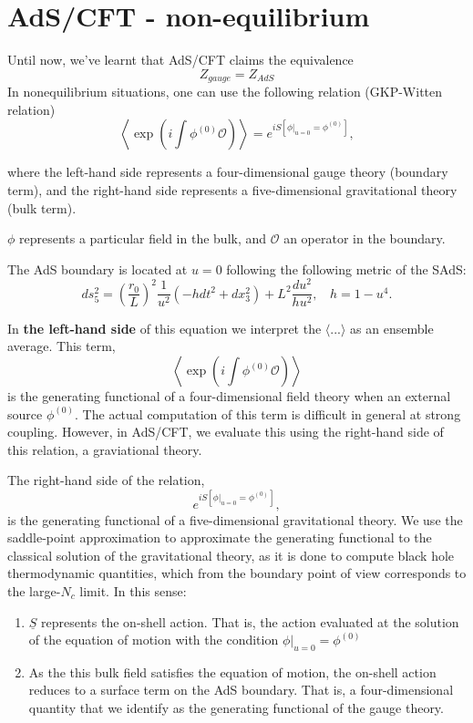 \documentclass[12pt]{article}
\begin{document}
\section{AdS/CFT - non-equilibrium}

Until now, we've learnt that AdS/CFT claims the equivalence
\[
    Z_{gauge} = Z_{AdS}
\]
In nonequilibrium situations, one can use the following relation (GKP-Witten relation)
\[
    \left\langle\exp\left(i\int \phi^{(0)} \mathcal{O}\right)\right\rangle = e^{iS[\left.\phi\right|_{u=0}=\phi^{(0)}]},
\]

where the left-hand side represents a four-dimensional gauge theory (boundary term), and the right-hand side represents a five-dimensional gravitational theory (bulk term).

\vspace{.25cm}

$\phi$ represents a particular field in the bulk, and $\mathcal{O}$ an operator in the boundary.

\vspace{.25cm}

The AdS boundary is located at $u=0$ following the following metric of the SAdS:
\[
    ds_5^2=\left(\frac{r_0}{L}\right)^2 \frac{1}{u^2}(-hdt^2+dx_3^2) + L^2 \frac{du^2}{hu^2}, ~~~~ h = 1-u^4.
\]

\vspace{.25cm}

In \textbf{the left-hand side} of this equation we interpret the $\langle...\rangle$ as an ensemble average. This term,
\[
    \left\langle\exp\left(i\int \phi^{(0)} \mathcal{O}\right)\right\rangle
\]
is the generating functional of a four-dimensional field theory when an external source $\phi^{(0)}$. The actual computation of this term is difficult in general at strong coupling. However, in AdS/CFT, we evaluate this using the right-hand side of this relation, a graviational theory.

The right-hand side of the relation,
\[
    e^{iS[\left.\phi\right|_{u=0}=\phi^{(0)}]},
\]
is the generating functional of a five-dimensional gravitational theory. We use the saddle-point approximation to approximate the generating functional to the classical solution of the gravitational theory, as it is done to compute black hole thermodynamic quantities, which from the boundary point of view corresponds to the large-$N_c$ limit. In this sense:
\begin{enumerate}
    \item $\underline{S}$ represents the on-shell action. That is, the action evaluated at the solution of the equation of motion with the condition $\left.\phi\right|_{u=0}=\phi^{(0)}$
    \item As the this bulk field satisfies the equation of motion, the on-shell action reduces to a surface term on the AdS boundary. That is, a four-dimensional quantity that we identify as the generating functional of the gauge theory.
\end{enumerate}
\end{document}
